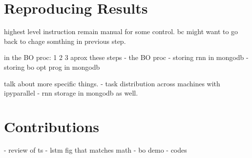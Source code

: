 
%




\chapter{Reproducing Results}
\label{ch:reproduce}

highest level instruction remain manual for some control. bc might want to go back to chage somthing in previous step.

in the BO proc: 1 2 3 aprox these steps
- the BO proc
- storing rnn in mongodb
- storing bo opt prog in mongodb

talk about more specific things.
- task distribution across machines with ipyparallel
- rnn storage in mongodb as well.

\chapter{Contributions}

- review of ts
- lstm fig that matches math
- bo demo
- codes

